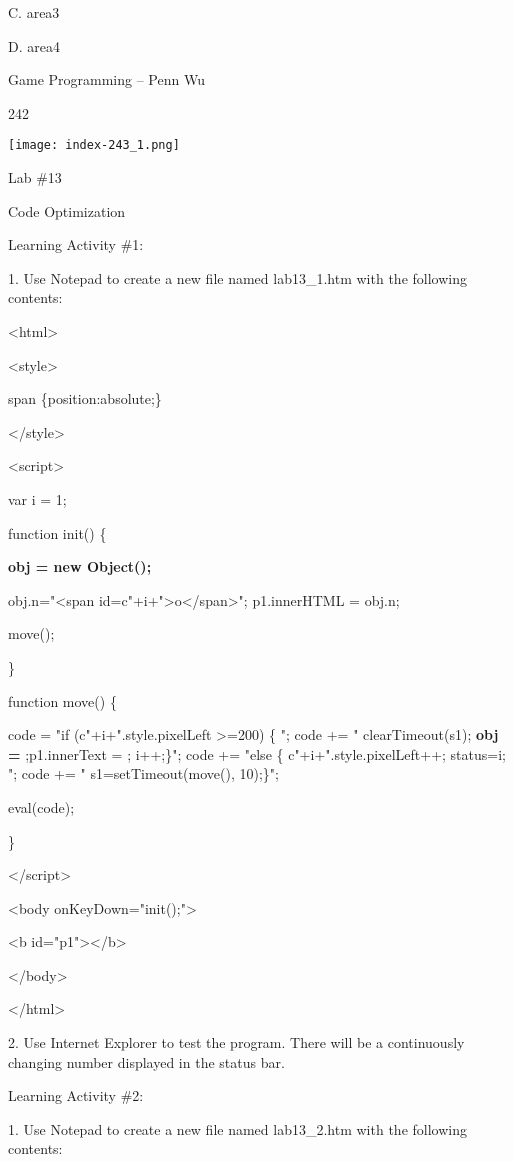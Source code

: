\documentclass[
]{article}
\begin{document}
C. area3

D. area4

Game Programming -- Penn Wu

242

\protect\hypertarget{index_split_012.htmlux5cux23p243}{}{}\texttt{[image: index-243\_1.png]}

Lab \#13

Code Optimization

Learning Activity \#1:

1. Use Notepad to create a new file named lab13\_1.htm with the
following contents:

\textless html\textgreater{}

\textless style\textgreater{}

span \{position:absolute;\}

\textless/style\textgreater{}

\textless script\textgreater{}

var i = 1;

function init() \{

\textbf{obj = new Object();}

obj.n="\textless span
id=\textquotesingle c"+i+"\textquotesingle\textgreater o\textless/span\textgreater";
p1.innerHTML = obj.n;

move();

\}

function move() \{

code = "if (c"+i+".style.pixelLeft \textgreater=200) \{ "; code += "
clearTimeout(s1); \textbf{obj = \textquotesingle\textquotesingle{}}
;p1.innerText = \textquotesingle\textquotesingle; i++;\}"; code += "else
\{ c"+i+".style.pixelLeft++; status=i; "; code += "
s1=setTimeout(\textquotesingle move()\textquotesingle, 10);\}";

eval(code);

\}

\textless/script\textgreater{}

\textless body onKeyDown="init();"\textgreater{}

\textless b id="p1"\textgreater\textless/b\textgreater{}

\textless/body\textgreater{}

\textless/html\textgreater{}

2. Use Internet Explorer to test the program. There will be a
continuously changing number displayed in the status bar.

Learning Activity \#2:

1. Use Notepad to create a new file named lab13\_2.htm with the
following contents:
\end{document}
